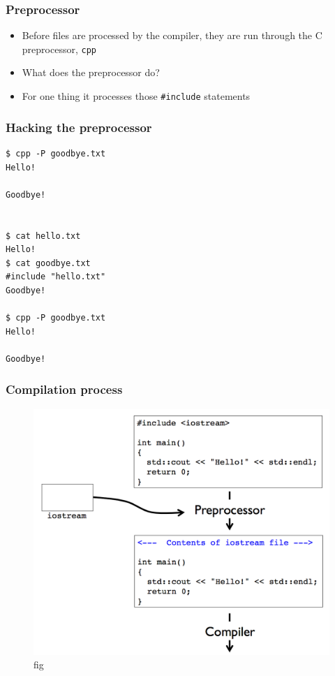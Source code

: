 \documentclass[12pt,letterpaper,twoside]{article}
\begin{document}
\subsubsection{Preprocessor}
\begin{itemize}
\item
  Before files are processed by the compiler, they are run through the C
  preprocessor, \texttt{cpp}
\item
  What does the preprocessor do?
\item
  For one thing it processes those \texttt{\#include} statements
\end{itemize}

\subsubsection{Hacking the preprocessor}
\begin{verbatim}
$ cpp -P goodbye.txt 
Hello!

Goodbye!


$ cat hello.txt 
Hello!
$ cat goodbye.txt 
#include "hello.txt"
Goodbye!

$ cpp -P goodbye.txt 
Hello!

Goodbye!
\end{verbatim}

\subsubsection{Compilation process}
\begin{figure}
\centering
\includegraphics{fig/compilation.png}
\caption{fig}
\end{figure}
\end{document}
